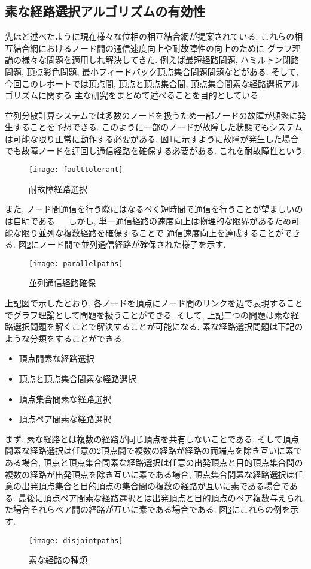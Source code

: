 \documentclass[specialreport]{subfiles}
\begin{document}
\subsection{素な経路選択アルゴリズムの有効性}
先ほど述べたように現在様々な位相の相互結合網が提案されている.
これらの相互結合網におけるノード間の通信速度向上や耐故障性の向上のために
グラフ理論の様々な問題を適用しれ解決してきた.
例えば最短経路問題, ハミルトン閉路問題, 頂点彩色問題, 最小フィードバック頂点集合問題問題などがある.
そして,今回このレポートでは頂点間, 頂点と頂点集合間, 頂点集合間素な経路選択アルゴリズムに関する
主な研究をまとめて述べることを目的としている.

並列分散計算システムでは多数のノードを扱うため一部ノードの故障が頻繁に発生することを予想できる.
このように一部のノードが故障した状態でもシステムは可能な限り正常に動作する必要がある. 
図\ref{fig:faulttolerant}に示すように故障が発生した場合でも故障ノードを迂回し通信経路を確保する必要がある.
これを耐故障性という.
\begin{figure}[htb]
\centering
\texttt{[image: faulttolerant]}
\caption{耐故障経路選択}
\label{fig:faulttolerant}
\end{figure}

また, ノード間通信を行う際にはなるべく短時間で通信を行うことが望ましいのは自明である.　
しかし, 単一通信経路の速度向上は物理的な限界があるため可能な限り並列な複数経路を確保することで
通信速度向上を達成することができる. 図\ref{fig:parallelpaths}にノード間で並列通信経路が確保された様子を示す.

\begin{figure}[htb]
\centering
\texttt{[image: parallelpaths]}
\caption{並列通信経路確保}
\label{fig:parallelpaths}
\end{figure}

上記図で示したとおり, 各ノードを頂点にノード間のリンクを辺で表現することでグラフ理論として問題を扱うことができる.
そして, 上記二つの問題は素な経路選択問題を解くことで解決することが可能になる. 素な経路選択問題は下記のような分類をすることができる.
\begin{itemize}
\item 頂点間素な経路選択
\item 頂点と頂点集合間素な経路選択
\item 頂点集合間素な経路選択
\item 頂点ペア間素な経路選択
\end{itemize}
まず, 素な経路とは複数の経路が同じ頂点を共有しないことである. 
そして頂点間素な経路選択は任意の2頂点間で複数の経路が経路の両端点を除き互いに素である場合, 
頂点と頂点集合間素な経路選択は任意の出発頂点と目的頂点集合間の複数の経路が出発頂点を除き互いに素である場合,
頂点集合間素な経路選択は任意の出発頂点集合と目的頂点の集合間の複数の経路が互いに素である場合である.
最後に頂点ペア間素な経路選択とは出発頂点と目的頂点のペア複数与えられた場合それらペア間の経路が互いに素である場合である.
図\ref{fig:disjointpaths}にこれらの例を示す.

\begin{figure}[htb]
\centering
\texttt{[image: disjointpaths]}
\caption{素な経路の種類}
\label{fig:disjointpaths}
\end{figure}
\end{document}
